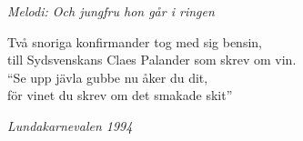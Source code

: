 {\footnotesize\textit{Melodi: Och jungfru hon går i ringen}}\par
\vspace{10pt}
Två snoriga konfirmander tog med sig bensin,\\
till Sydsvenskans Claes Palander som skrev om vin.\\
``Se upp jävla gubbe nu åker du dit,\\
för vinet du skrev om det smakade skit''\par
\vspace{10pt}
{\footnotesize\textit{Lundakarnevalen 1994}}
